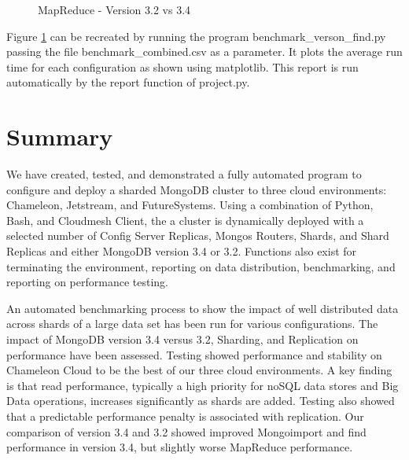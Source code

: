 \documentclass[9pt,twocolumn,twoside]{../../styles/osajnl}
\begin{document}
\begin{figure}[htbp]
\centering
{}
\caption{MapReduce - Version 3.2 vs 3.4}
\label{fig:version-mapreduce}
\end{figure}

Figure \ref{fig:version-mapreduce} can be recreated by running the program benchmark\_verson\_find.py passing the file benchmark\_combined.csv as a parameter.  It plots the average run time for each configuration as shown using matplotlib.  This report is run automatically by the report function of project.py.



\section{Summary}

We have created, tested, and demonstrated a fully automated program to configure and deploy a sharded MongoDB cluster to three cloud environments: Chameleon, Jetstream, and FutureSystems.  Using a combination of Python, Bash, and Cloudmesh Client, the a cluster is dynamically deployed with a selected number of Config Server Replicas, Mongos Routers, Shards, and Shard Replicas and either MongoDB version 3.4 or 3.2. Functions also exist for terminating the environment, reporting on data distribution, benchmarking, and reporting on performance testing.

An automated benchmarking process to show the impact of well distributed data across shards of a large data set has been run for various configurations. The impact of MongoDB version 3.4 versus 3.2, Sharding, and Replication on performance have been assessed.  Testing showed performance and stability on Chameleon Cloud to be the best of our three cloud environments.  A key finding is that read performance, typically a high priority for noSQL data stores and Big Data operations, increases significantly as shards are added.  Testing also showed that a predictable performance penalty is associated with replication.  Our comparison of version 3.4 and 3.2 showed improved Mongoimport and find performance in version 3.4, but slightly worse MapReduce performance. 
\end{document}
